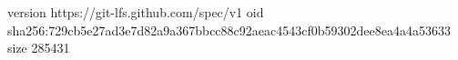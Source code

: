 version https://git-lfs.github.com/spec/v1
oid sha256:729cb5e27ad3e7d82a9a367bbcc88c92aeac4543cf0b59302dee8ea4a4a53633
size 285431
